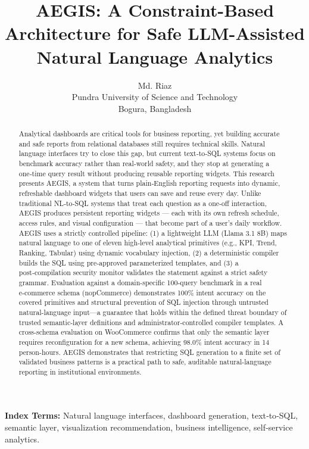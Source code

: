 \documentclass[11pt]{article}
\title{AEGIS: A Constraint-Based Architecture for Safe LLM-Assisted Natural Language Analytics}
\author{Md. Riaz\\
Pundra University of Science and Technology\\
Bogura, Bangladesh}
\date{}
\begin{document}
\maketitle

\begin{abstract}
Analytical dashboards are critical tools for business reporting, yet building accurate and safe reports from relational databases still requires technical skills. Natural language interfaces try to close this gap, but current text‑to‑SQL systems focus on benchmark accuracy rather than real‑world safety, and they stop at generating a one‑time query result without producing reusable reporting widgets. This research presents AEGIS, a system that turns plain‑English reporting requests into dynamic, refreshable dashboard widgets that users can save and reuse every day. Unlike traditional NL‑to‑SQL systems that treat each question as a one‑off interaction, AEGIS produces persistent reporting widgets --- each with its own refresh schedule, access rules, and visual configuration --- that become part of a user's daily workflow. AEGIS uses a strictly controlled pipeline: (1) a lightweight LLM (Llama 3.1 8B) maps natural language to one of eleven high‑level analytical primitives (e.g., KPI, Trend, Ranking, Tabular) using dynamic vocabulary injection, (2) a deterministic compiler builds the SQL using pre‑approved parameterized templates, and (3) a post‑compilation security monitor validates the statement against a strict safety grammar. Evaluation against a domain-specific 100-query benchmark in a real e‑commerce schema (nopCommerce) demonstrates 100\% intent accuracy on the covered primitives and structural prevention of SQL injection through untrusted natural-language input—a guarantee that holds within the defined threat boundary of trusted semantic-layer definitions and administrator-controlled compiler templates. A cross-schema evaluation on WooCommerce confirms that only the semantic layer requires reconfiguration for a new schema, achieving 98.0\% intent accuracy in 14 person-hours. AEGIS demonstrates that restricting SQL generation to a finite set of validated business patterns is a practical path to safe, auditable natural-language reporting in institutional environments.
\end{abstract}

\noindent\textbf{Index Terms:} Natural language interfaces, dashboard generation, text‑to‑SQL, semantic layer, visualization recommendation, business intelligence, self‑service analytics.
\end{document}
